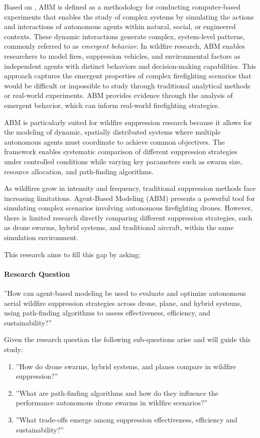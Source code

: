 \documentclass[twoside]{article}
\begin{document}
Based on \citet{wilensky2015introduction}, ABM is defined as a methodology for conducting computer-based experiments that enables the study of complex systems by simulating the actions and interactions of autonomous agents within natural, social, or engineered contexts. These dynamic interactions generate complex, system-level patterns, commonly referred to as \textit{emergent behavior}. In wildfire research, ABM enables researchers to model fires, suppression vehicles, and environmental factors as independent agents with distinct behaviors and decision-making capabilities. This approach captures the emergent properties of complex firefighting scenarios that would be difficult or impossible to study through traditional analytical methods or real-world experiments. ABM provides evidence through the analysis of emergent behavior, which can inform real-world firefighting strategies.

ABM is particularly suited for wildfire suppression research because it allows for the modeling of dynamic, spatially distributed systems where multiple autonomous agents must coordinate to achieve common objectives. The framework enables systematic comparison of different suppression strategies under controlled conditions while varying key parameters such as swarm size, resource allocation, and path-finding algorithms.

As wildfires grow in intensity and frequency, traditional suppression methods face increasing limitations. Agent-Based Modeling (ABM) presents a powerful tool for simulating complex scenarios involving autonomous firefighting drones. However, there is limited research directly comparing different suppression strategies, such as drone swarms, hybrid systems, and traditional aircraft, within the same simulation environment.

This research aims to fill this gap by asking:

\paragraph{Research Question}

''How can agent-based modeling be used to evaluate and optimize autonomous aerial wildfire suppression strategies across drone, plane, and hybrid systems, using path-finding algorithms to assess effectiveness, efficiency, and sustainability?''

Given the research question the following sub-questions arise and will guide this study:
\begin{enumerate}
  \item ''How do drone swarms, hybrid systems, and planes compare in wildfire suppression?''
  \item ''What are path-finding algorithms and how do they influence the performance autonomous drone swarms in wildfire scenarios?''
  \item ''What trade-offs emerge among suppression effectiveness, efficiency and sustainability?''
\end{enumerate}
\end{document}

